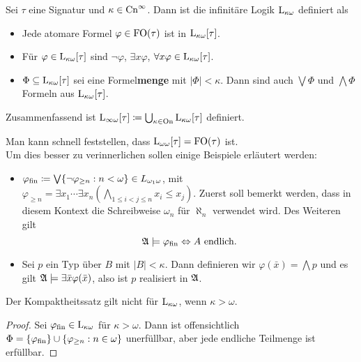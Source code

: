 \begin{definition}
	Sei $\tau$ eine Signatur und $\kappa\in \operatorname{Cn}^\infty$. Dann ist die infinitäre Logik $\operatorname{L}_{\kappa\omega}$ definiert als
	\begin{itemize}
		\item Jede atomare Formel $\varphi\in \operatorname{FO}(\tau)$ ist in $\operatorname{L}_{\kappa\omega}[\tau]$.
		\item Für $\varphi\in \operatorname{L}_{\kappa\omega}[\tau]$ sind $\neg\varphi$, $\exists x \varphi$, $\forall x \varphi\in \operatorname{L}_{\kappa\omega}[\tau]$.
		\item $\Phi\subseteq \operatorname{L}_{\kappa\omega}[\tau]$ sei eine Formel\textbf{menge} mit $\vert\Phi\vert<\kappa$. Dann sind auch $\bigvee\Phi$ und $\bigwedge \Phi$ Formeln aus $\operatorname{L}_{\kappa\omega}[\tau]$.
	\end{itemize}
	Zusammenfassend ist $\operatorname{L}_{\infty\omega}[\tau]\coloneqq\bigcup_{\kappa\in\operatorname{On}} \operatorname{L}_{\kappa\omega}[\tau]$ definiert.
\end{definition}
Man kann schnell feststellen, dass $\operatorname{L}_{\omega\omega}[\tau]=\operatorname{FO}(\tau)$ ist.
\\
Um dies besser zu verinnerlichen sollen einige Beispiele erläutert werden:
\begin{example}
\begin{itemize}
	\item $\varphi_{\operatorname{fin}}\coloneqq\bigvee \{\neg\varphi_{\geq n}: n< \omega\} \in L_{\omega_1\omega}$, mit $\varphi_{\geq n}=\exists x_1\cdots \exists x_n(\bigwedge_{1\leq i < j \leq n}x_i\leq x_j)$. 
	Zuerst soll bemerkt werden, dass in diesem Kontext die Schreibweise $\omega_n$ für $\aleph_n$ verwendet wird. Des Weiteren gilt
	$$\mathfrak{A}\models\varphi_{\operatorname{fin}} \Leftrightarrow A \text{ endlich}.$$
	\item Sei $p$ ein Typ über $B$ mit $\vert B\vert<\kappa$. Dann definieren wir $\varphi(\bar{x})=\bigwedge p$ und es gilt $\mathfrak{A}\models \exists \bar{x} \varphi(\bar{x})$, also ist $p$ realisiert in $\mathfrak{A}$.
\end{itemize}
\end{example}

\begin{satz}
	Der Kompaktheitssatz gilt nicht für $\operatorname{L}_{\kappa\omega}$, wenn $\kappa>\omega$.
\end{satz}
\begin{proof}
	Sei $\varphi_{\operatorname{fin}}\in \operatorname{L}_{\kappa\omega}$ für $\kappa>\omega$. 
	Dann ist offensichtlich $\Phi=\{\varphi_{\operatorname{fin}}\}\cup\{\varphi_{\geq n}:n\in\omega\}$ unerfüllbar, aber jede endliche Teilmenge ist erfüllbar.
\end{proof}

